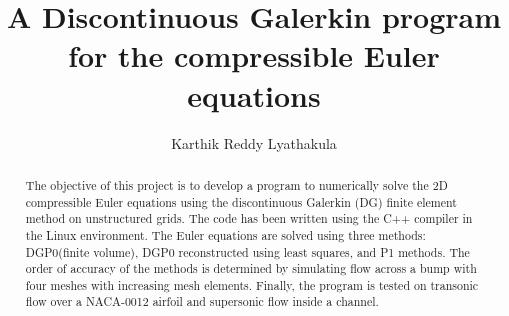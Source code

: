 \documentclass[12pt]{elsarticle}
\begin{document}
	
	\begin{frontmatter}
		
		
		
		\title{A Discontinuous Galerkin program for the compressible Euler equations}
		
		
		
		
		\author{Karthik Reddy Lyathakula}
		
		\address{North Carolina State University, Raleigh,  United States}
		
		\begin{abstract}
			The objective of this project is to develop a program to numerically solve the 2D compressible Euler equations using the discontinuous Galerkin (DG) finite element method on unstructured grids. The code has been written using the C++ compiler in the Linux environment. The Euler equations are solved using three methods: DGP0(finite volume), DGP0 reconstructed using least squares, and P1 methods. The order of accuracy of the methods is determined by simulating flow across a bump with four meshes with increasing mesh elements. Finally, the program is tested on transonic flow over a NACA-0012 airfoil and supersonic flow inside a channel.
		\end{abstract}
		
		
	\end{frontmatter}
	
	
\end{document}
